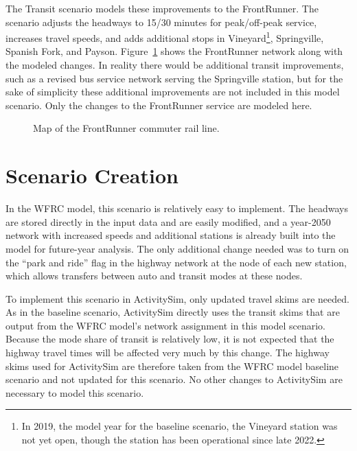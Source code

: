 \documentclass[fancy, oneside, mastersfancy, ms]{byuthesis}
\begin{document}
The Transit scenario models these improvements to the FrontRunner. The
scenario adjusts the headways to 15/30 minutes for peak/off-peak
service, increases travel speeds, and adds additional stops in
Vineyard\footnote{In 2019, the model year for the baseline scenario, the
  Vineyard station was not yet open, though the station has been
  operational since late 2022.}, Springville, Spanish Fork, and Payson.
Figure~\ref{fig-frontrunner-map} shows the FrontRunner network along
with the modeled changes. In reality there would be additional transit
improvements, such as a revised bus service network serving the
Springville station, but for the sake of simplicity these additional
improvements are not included in this model scenario. Only the changes
to the FrontRunner service are modeled here.

\begin{figure}[p]


\caption{\label{fig-frontrunner-map}Map of the FrontRunner commuter rail
line.}

\end{figure}%

\section{Scenario Creation}\label{scenario-creation-1}

In the WFRC model, this scenario is relatively easy to implement. The
headways are stored directly in the input data and are easily modified,
and a year-2050 network with increased speeds and additional stations is
already built into the model for future-year analysis. The only
additional change needed was to turn on the ``park and ride'' flag in
the highway network at the node of each new station, which allows
transfers between auto and transit modes at these nodes.

To implement this scenario in ActivitySim, only updated travel skims are
needed. As in the baseline scenario, ActivitySim directly uses the
transit skims that are output from the WFRC model's network assignment
in this model scenario. Because the mode share of transit is relatively
low, it is not expected that the highway travel times will be affected
very much by this change. The highway skims used for ActivitySim are
therefore taken from the WFRC model baseline scenario and not updated
for this scenario. No other changes to ActivitySim are necessary to
model this scenario.
\end{document}
